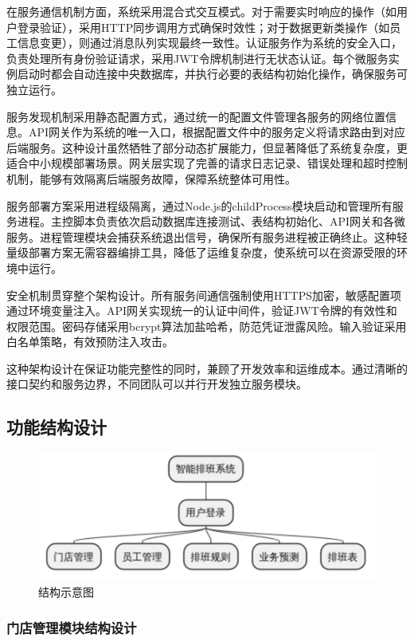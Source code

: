 \documentclass{ctexart}
\begin{document}
在服务通信机制方面，系统采用混合式交互模式。对于需要实时响应的操作（如用户登录验证），采用HTTP同步调用方式确保时效性；对于数据更新类操作（如员工信息变更），则通过消息队列实现最终一致性。认证服务作为系统的安全入口，负责处理所有身份验证请求，采用JWT令牌机制进行无状态认证。每个微服务实例启动时都会自动连接中央数据库，并执行必要的表结构初始化操作，确保服务可独立运行。

服务发现机制采用静态配置方式，通过统一的配置文件管理各服务的网络位置信息。API网关作为系统的唯一入口，根据配置文件中的服务定义将请求路由到对应后端服务。这种设计虽然牺牲了部分动态扩展能力，但显著降低了系统复杂度，更适合中小规模部署场景。网关层实现了完善的请求日志记录、错误处理和超时控制机制，能够有效隔离后端服务故障，保障系统整体可用性。

服务部署方案采用进程级隔离，通过Node.js的childProcess模块启动和管理所有服务进程。主控脚本负责依次启动数据库连接测试、表结构初始化、API网关和各微服务。进程管理模块会捕获系统退出信号，确保所有服务进程被正确终止。这种轻量级部署方案无需容器编排工具，降低了运维复杂度，使系统可以在资源受限的环境中运行。

安全机制贯穿整个架构设计。所有服务间通信强制使用HTTPS加密，敏感配置项通过环境变量注入。API网关实现统一的认证中间件，验证JWT令牌的有效性和权限范围。密码存储采用bcrypt算法加盐哈希，防范凭证泄露风险。输入验证采用白名单策略，有效预防注入攻击。

这种架构设计在保证功能完整性的同时，兼顾了开发效率和运维成本。通过清晰的接口契约和服务边界，不同团队可以并行开发独立服务模块。


\subsection{功能结构设计}
\begin{figure}[H]
    \centering
    \includegraphics[width=0.8\linewidth]{./source/结构示意图.png}
    \caption{结构示意图}
\end{figure}

\subsubsection{门店管理模块结构设计}
\end{document}
